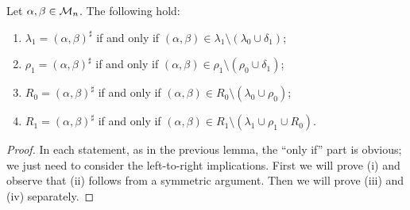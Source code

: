 \begin{lemma}
  \label{lem:high-genpairs}
  Let $\alpha,\beta \in \mathcal{M}_n$.  The following hold:
  \begin{enumerate}[\rm(i)]
  \item $\lambda_1 = (\alpha, \beta)^\sharp$ if and only if
    $(\alpha,\beta) \in \lambda_1 \setminus (\lambda_0 \cup \delta_1)$;
  \item $\rho_1 = (\alpha, \beta)^\sharp$ if and only if
    $(\alpha,\beta) \in \rho_1 \setminus (\rho_0 \cup \delta_1)$;
  \item $R_0 = (\alpha, \beta)^\sharp$ if and only if
    $(\alpha,\beta) \in R_0 \setminus (\lambda_0 \cup \rho_0)$;
  \item $R_1 = (\alpha, \beta)^\sharp$ if and only if
    $(\alpha,\beta) \in R_1 \setminus (\lambda_1 \cup \rho_1 \cup R_0)$.
  \end{enumerate}
  \begin{proof}
    In each statement, as in the previous lemma, the ``only if'' part is
    obvious; we just need to consider the left-to-right implications.  First we
    will prove (i) and observe that (ii) follows from a symmetric argument.
    Then we will prove (iii) and (iv) separately.


\end{proof}
\end{lemma}
